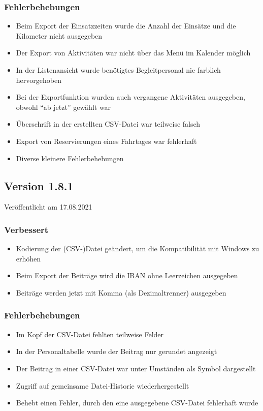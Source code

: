\begin{neu}
\subsubsection{Fehlerbehebungen}
\begin{itemize}
  \item
  Beim Export der Einsatzzeiten wurde die Anzahl der Einsätze und die Kilometer nicht ausgegeben
  \item
  Der Export von Aktivitäten war nicht über das Menü im Kalender möglich
  \item
  In der Listenansicht wurde benötigtes Begleitpersonal nie farblich hervorgehoben
  \item
  Bei der Exportfunktion wurden auch vergangene Aktivitäten ausgegeben, obwohl "`ab jetzt"' gewählt war
  \item
  Überschrift in der erstellten CSV-Datei war teilweise falsch
  \item
  Export von Reservierungen eines Fahrtages war fehlerhaft
  \item
  Diverse kleinere Fehlerbehebungen
\end{itemize}

\subsection{Version 1.8.1}
\label{version:1:8:1}
Veröffentlicht am 17.08.2021
\subsubsection{Verbessert}
\begin{itemize}
  \item
  Kodierung der (CSV-)Datei geändert, um die Kompatibilität mit Windows zu erhöhen
  \item
  Beim Export der Beiträge wird die IBAN ohne Leerzeichen ausgegeben
  \item
  Beiträge werden jetzt mit Komma (als Dezimaltrenner) ausgegeben
\end{itemize}

\subsubsection{Fehlerbehebungen}
\begin{itemize}
  \item
  Im Kopf der CSV-Datei fehlten teilweise Felder
  \item
  In der Personaltabelle wurde der Beitrag nur gerundet angezeigt
  \item
  Der Beitrag in einer CSV-Datei war unter Umständen als Symbol dargestellt
  \item
  Zugriff auf gemeinsame Datei-Historie wiederhergestellt
  \item
  Behebt einen Fehler, durch den eine ausgegebene CSV-Datei fehlerhaft wurde
\end{itemize}
\end{neu}
